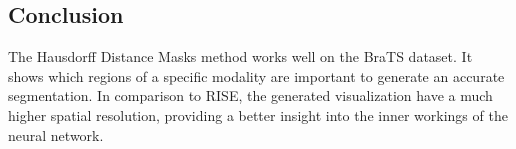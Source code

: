 \subsection{Conclusion}
The Hausdorff Distance Masks method works well on the BraTS dataset. It shows which regions of a specific modality are important to generate an accurate segmentation. In comparison to RISE, the generated visualization have a much higher spatial resolution, providing a better insight into the inner workings of the neural network.
